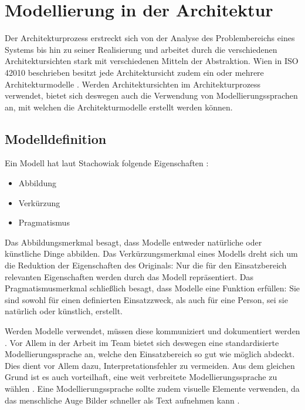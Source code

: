 \chapter{Modellierung in der Architektur}
Der Architekturprozess \glqq erstreckt sich von der Analyse des Problembereichs eines Systems bis hin zu seiner Realisierung\grqq \cite[S. 10]{softarch} und arbeitet durch die verschiedenen Architektursichten stark mit verschiedenen Mitteln der Abstraktion. Wien in ISO 42010 beschrieben besitzt jede Architektursicht zudem ein oder mehrere Architekturmodelle \cite{ISO_ARCH}. Werden Architektursichten im Architekturprozess verwendet, bietet sich deswegen auch die Verwendung von Modellierungssprachen an, mit welchen die Architekturmodelle erstellt werden können.

\section{Modelldefinition}
Ein Modell hat laut Stachowiak folgende Eigenschaften \cite[S. 131-133]{modell}:

\begin{itemize}
  \item Abbildung
  \item Verkürzung
  \item Pragmatismus
\end{itemize}

Das Abbildungsmerkmal besagt, dass Modelle entweder natürliche oder künstliche Dinge abbilden. Das Verkürzungsmerkmal eines Modells dreht sich um die Reduktion der Eigenschaften des Originals: Nur die für den Einsatzbereich relevanten Eigenschaften werden durch das Modell repräsentiert. Das Pragmatismusmerkmal schließlich besagt, dass Modelle eine Funktion erfüllen: Sie sind sowohl für einen definierten Einsatzzweck, als auch für eine Person, sei sie natürlich oder künstlich, erstellt. \cite[S. 131-133]{modell}

Werden Modelle verwendet, müssen diese kommuniziert und dokumentiert werden \cite[S. 12]{reqanalysis}. Vor Allem in der Arbeit im Team bietet sich deswegen eine standardisierte Modellierungssprache an, welche den Einsatzbereich so gut wie möglich abdeckt. Dies dient vor Allem dazu, Interpretationsfehler zu vermeiden. Aus dem gleichen Grund ist es auch vorteilhaft, eine weit verbreitete Modellierungssprache zu wählen \cite[S. 139]{effektiv}. Eine Modellierungssprache sollte zudem visuelle Elemente verwenden, da das menschliche Auge Bilder schneller als Text aufnehmen kann \cite[S. 12]{reqanalysis}.

